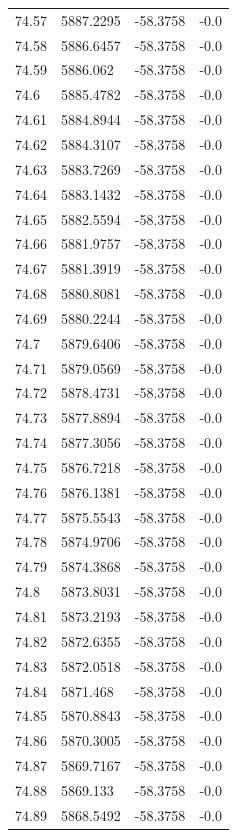 \begin{table}[H]
\begin{tabular}{llll}
74.57 & 5887.2295 & -58.3758 & -0.0 \\
74.58 & 5886.6457 & -58.3758 & -0.0 \\
74.59 & 5886.062 & -58.3758 & -0.0 \\
74.6 & 5885.4782 & -58.3758 & -0.0 \\
74.61 & 5884.8944 & -58.3758 & -0.0 \\
74.62 & 5884.3107 & -58.3758 & -0.0 \\
74.63 & 5883.7269 & -58.3758 & -0.0 \\
74.64 & 5883.1432 & -58.3758 & -0.0 \\
74.65 & 5882.5594 & -58.3758 & -0.0 \\
74.66 & 5881.9757 & -58.3758 & -0.0 \\
74.67 & 5881.3919 & -58.3758 & -0.0 \\
74.68 & 5880.8081 & -58.3758 & -0.0 \\
74.69 & 5880.2244 & -58.3758 & -0.0 \\
74.7 & 5879.6406 & -58.3758 & -0.0 \\
74.71 & 5879.0569 & -58.3758 & -0.0 \\
74.72 & 5878.4731 & -58.3758 & -0.0 \\
74.73 & 5877.8894 & -58.3758 & -0.0 \\
74.74 & 5877.3056 & -58.3758 & -0.0 \\
74.75 & 5876.7218 & -58.3758 & -0.0 \\
74.76 & 5876.1381 & -58.3758 & -0.0 \\
74.77 & 5875.5543 & -58.3758 & -0.0 \\
74.78 & 5874.9706 & -58.3758 & -0.0 \\
74.79 & 5874.3868 & -58.3758 & -0.0 \\
74.8 & 5873.8031 & -58.3758 & -0.0 \\
74.81 & 5873.2193 & -58.3758 & -0.0 \\
74.82 & 5872.6355 & -58.3758 & -0.0 \\
74.83 & 5872.0518 & -58.3758 & -0.0 \\
74.84 & 5871.468 & -58.3758 & -0.0 \\
74.85 & 5870.8843 & -58.3758 & -0.0 \\
74.86 & 5870.3005 & -58.3758 & -0.0 \\
74.87 & 5869.7167 & -58.3758 & -0.0 \\
74.88 & 5869.133 & -58.3758 & -0.0 \\
74.89 & 5868.5492 & -58.3758 & -0.0 \\

\end{tabular}
\end{table}

